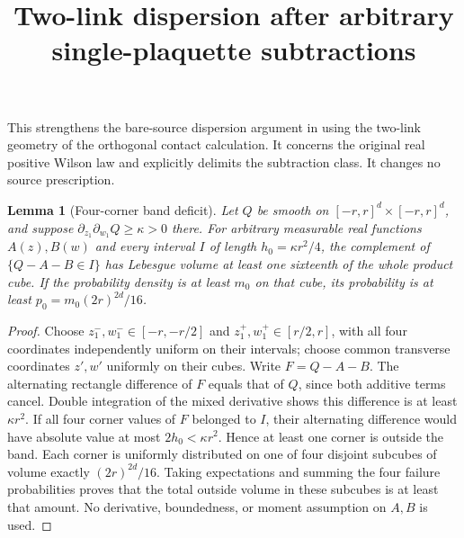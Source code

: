 \documentclass[11pt]{article}
\title{Two-link dispersion after arbitrary single-plaquette subtractions}\author{}\date{}
\newtheorem{lemma}{Lemma}
\begin{document}
\maketitle
This strengthens the bare-source dispersion argument in \cite[Section~2]{ND}
using the two-link geometry of the orthogonal contact calculation. It concerns the original real positive
Wilson law and explicitly delimits the subtraction class. It changes no source prescription.

\begin{lemma}[Four-corner band deficit]
Let $Q$ be smooth on $[-r,r]^d\times[-r,r]^d$, and suppose
$\partial_{z_1}\partial_{w_1}Q\ge\kappa>0$ there.
For arbitrary measurable real functions $A(z),B(w)$ and every interval $I$ of length
$h_0=\kappa r^2/4$, the complement of
$\{Q-A-B\in I\}$ has Lebesgue volume at least one sixteenth of the whole product cube.
If the probability density is at least $m_0$ on that cube, its probability is at least
$p_0=m_0(2r)^{2d}/16$.
\end{lemma}
\begin{proof}
Choose $z_1^-,w_1^-\in[-r,-r/2]$ and $z_1^+,w_1^+\in[r/2,r]$, with all four
coordinates independently uniform on their intervals; choose common transverse coordinates
$z',w'$ uniformly on their cubes. Write $F=Q-A-B$.
The alternating rectangle difference of $F$ equals that of $Q$, since both additive
terms cancel. Double integration of the mixed derivative shows this difference is at
least $\kappa r^2$.
If all four corner values of $F$ belonged to $I$, their alternating difference would have
absolute value at most $2h_0<\kappa r^2$. Hence at least one corner is outside the band.
Each corner is uniformly distributed on one of four disjoint subcubes of volume exactly
$(2r)^{2d}/16$. Taking expectations and summing the four failure probabilities proves
that the total outside volume in these subcubes is at least that amount.
No derivative, boundedness, or moment assumption on $A,B$ is used.
\end{proof}
\end{document}
